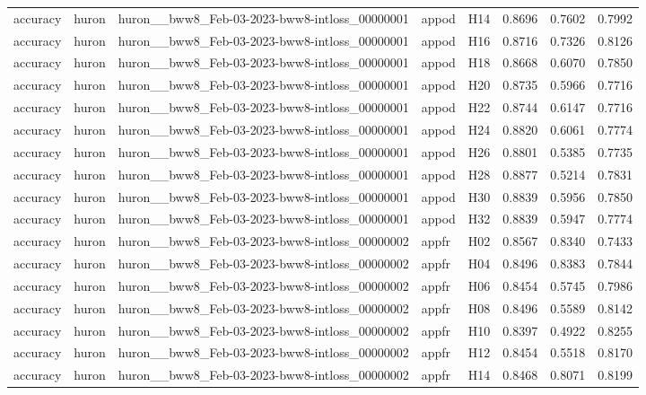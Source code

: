 \begin{table}[tbp]
\begin{tabular}{lllllrrr}
accuracy & huron & huron\_\_bww8\_Feb-03-2023-bww8-intloss\_00000001 & appod & H14 & 0.8696 & 0.7602 & 0.7992 \\
accuracy & huron & huron\_\_bww8\_Feb-03-2023-bww8-intloss\_00000001 & appod & H16 & 0.8716 & 0.7326 & 0.8126 \\
accuracy & huron & huron\_\_bww8\_Feb-03-2023-bww8-intloss\_00000001 & appod & H18 & 0.8668 & 0.6070 & 0.7850 \\
accuracy & huron & huron\_\_bww8\_Feb-03-2023-bww8-intloss\_00000001 & appod & H20 & 0.8735 & 0.5966 & 0.7716 \\
accuracy & huron & huron\_\_bww8\_Feb-03-2023-bww8-intloss\_00000001 & appod & H22 & 0.8744 & 0.6147 & 0.7716 \\
accuracy & huron & huron\_\_bww8\_Feb-03-2023-bww8-intloss\_00000001 & appod & H24 & 0.8820 & 0.6061 & 0.7774 \\
accuracy & huron & huron\_\_bww8\_Feb-03-2023-bww8-intloss\_00000001 & appod & H26 & 0.8801 & 0.5385 & 0.7735 \\
accuracy & huron & huron\_\_bww8\_Feb-03-2023-bww8-intloss\_00000001 & appod & H28 & 0.8877 & 0.5214 & 0.7831 \\
accuracy & huron & huron\_\_bww8\_Feb-03-2023-bww8-intloss\_00000001 & appod & H30 & 0.8839 & 0.5956 & 0.7850 \\
accuracy & huron & huron\_\_bww8\_Feb-03-2023-bww8-intloss\_00000001 & appod & H32 & 0.8839 & 0.5947 & 0.7774 \\
accuracy & huron & huron\_\_bww8\_Feb-03-2023-bww8-intloss\_00000002 & appfr & H02 & 0.8567 & 0.8340 & 0.7433 \\
accuracy & huron & huron\_\_bww8\_Feb-03-2023-bww8-intloss\_00000002 & appfr & H04 & 0.8496 & 0.8383 & 0.7844 \\
accuracy & huron & huron\_\_bww8\_Feb-03-2023-bww8-intloss\_00000002 & appfr & H06 & 0.8454 & 0.5745 & 0.7986 \\
accuracy & huron & huron\_\_bww8\_Feb-03-2023-bww8-intloss\_00000002 & appfr & H08 & 0.8496 & 0.5589 & 0.8142 \\
accuracy & huron & huron\_\_bww8\_Feb-03-2023-bww8-intloss\_00000002 & appfr & H10 & 0.8397 & 0.4922 & 0.8255 \\
accuracy & huron & huron\_\_bww8\_Feb-03-2023-bww8-intloss\_00000002 & appfr & H12 & 0.8454 & 0.5518 & 0.8170 \\
accuracy & huron & huron\_\_bww8\_Feb-03-2023-bww8-intloss\_00000002 & appfr & H14 & 0.8468 & 0.8071 & 0.8199 \\

\end{tabular}
\end{table}

